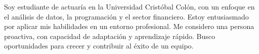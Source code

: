%
%
%
\par{
    Soy estudiante de actuaría en la Universidad Cristóbal Colón, con un enfoque en el análisis de datos, la
    programación y el sector financiero. Estoy entusiasmado por aplicar mis habilidades en un entorno profesional. Me
    considero una persona proactiva, con capacidad de adaptación y aprendizaje rápido. Busco oportunidades para
    crecer y contribuir al éxito de un equipo.
}